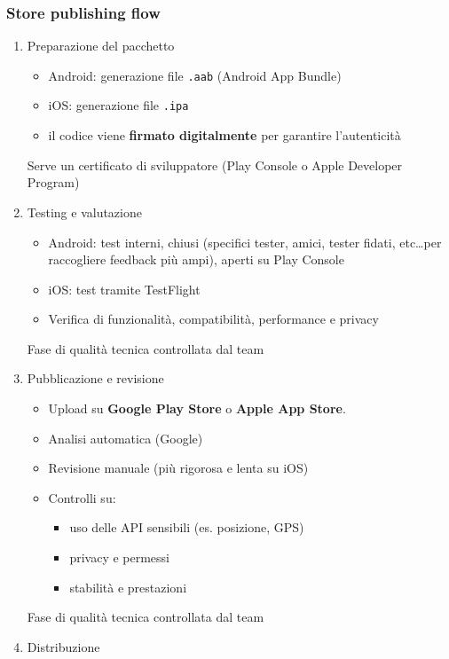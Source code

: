 \subsubsection{Store publishing flow}
\begin{enumerate}
    \item Preparazione del pacchetto
    \begin{itemize}
        \item Android: generazione file \texttt{.aab} (Android App Bundle)
        \item iOS: generazione file \texttt{.ipa}
        \item il codice viene \textbf{firmato digitalmente} per garantire l'autenticità
    \end{itemize}
    Serve un certificato di sviluppatore (Play Console o Apple Developer Program)
    \item Testing e valutazione
    \begin{itemize}
        \item Android: test interni, chiusi (specifici tester, amici, tester fidati, etc\dots per raccogliere feedback più ampi), aperti su Play Console
        \item iOS: test tramite TestFlight
        \item Verifica di funzionalità, compatibilità, performance e privacy
    \end{itemize}
    Fase di qualità tecnica controllata dal team
    \item Pubblicazione e revisione
    \begin{itemize}
        \item Upload su \textbf{Google Play Store} o \textbf{Apple App Store}.
        \item Analisi automatica (Google)
        \item Revisione manuale (più rigorosa e lenta su iOS)
        \item Controlli su:
        \begin{itemize}
            \item uso delle API sensibili (es. posizione, GPS)
            \item privacy e permessi
            \item stabilità e prestazioni
        \end{itemize}
    \end{itemize}
    Fase di qualità tecnica controllata dal team
    \item Distribuzione
    \begin{itemize}

\end{itemize}
\end{enumerate}
